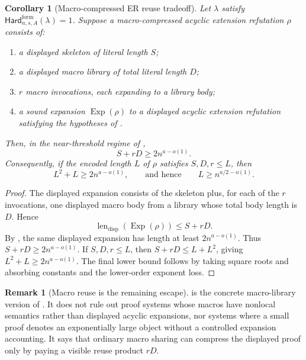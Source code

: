 \documentclass[11pt]{article}
\newtheorem{corollary}[theorem]{Corollary}
\theoremstyle{definition}
\newtheorem{remark}[theorem]{Remark}
\newcommand{\HardF}{\mathsf{Hard}^{\mathrm{form}}}
\begin{document}
\begin{corollary}[Macro-compressed ER reuse tradeoff]\label{cor:macro-compressed-er}
Let \(\lambda\) satisfy \(\HardF_{n,s,A}(\lambda)=1\).  Suppose a macro-compressed acyclic extension refutation \(\rho\) consists of:
\begin{enumerate}
  \item a displayed skeleton of literal length \(S\);
  \item a displayed macro library of total literal length \(D\);
  \item \(r\) macro invocations, each expanding to a library body;
  \item a sound expansion \(\operatorname{Exp}(\rho)\) to a displayed acyclic extension refutation satisfying the hypotheses of .
\end{enumerate}
Then, in the near-threshold regime of ,
\[
  S+rD\ge 2n^{a-o(1)}.
\]
Consequently, if the encoded length \(L\) of \(\rho\) satisfies \(S,D,r\le L\), then
\[
  L^2+L\ge 2n^{a-o(1)},
  \qquad\text{and hence}\qquad
  L\ge n^{a/2-o(1)}.
\]
\end{corollary}

\begin{proof}
The displayed expansion consists of the skeleton plus, for each of the \(r\) invocations, one displayed macro body from a library whose total body length is \(D\).  Hence
\[
  \operatorname{len}_{\mathrm{disp}}(\operatorname{Exp}(\rho))\le S+rD.
\]
By , the same displayed expansion has length at least \(2n^{a-o(1)}\).  Thus \(S+rD\ge 2n^{a-o(1)}\).  If \(S,D,r\le L\), then \(S+rD\le L+L^2\), giving \(L^2+L\ge 2n^{a-o(1)}\).  The final lower bound follows by taking square roots and absorbing constants and the lower-order exponent loss.
\end{proof}

\begin{remark}[Macro reuse is the remaining escape]\label{rem:macro-compressed-er-scope}
 is the concrete macro-library version of .  It does not rule out proof systems whose macros have nonlocal semantics rather than displayed acyclic expansions, nor systems where a small proof denotes an exponentially large object without a controlled expansion accounting.  It says that ordinary macro sharing can compress the displayed proof only by paying a visible reuse product \(rD\).
\end{remark}
\end{document}
